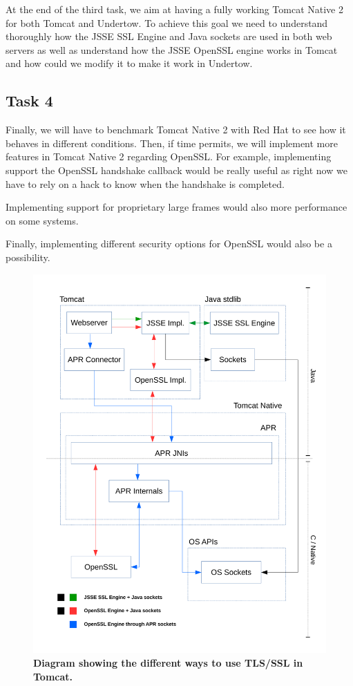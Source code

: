 \documentclass[11pt,a4paper,bibliography=totocnumbered]{scrartcl}
\def\mytitle{Tomcat Native 2}
\begin{document}
At the end of the third task, we aim at having a fully working \mytitle{} for both Tomcat and Undertow. To achieve this goal we need to understand thoroughly how the JSSE SSL Engine and Java sockets are used in both web servers as well as understand how the JSSE OpenSSL engine works in Tomcat and how could we modify it to make it work in Undertow.

\subsection{Task 4}
\label{subsec:task4}

Finally, we will have to benchmark \mytitle{} with Red Hat to see how it behaves in different conditions. Then, if time permits, we will implement more features in \mytitle{} regarding OpenSSL. For example, implementing support the OpenSSL handshake callback would be really useful as right now we have to rely on a hack to know when the handshake is completed.

Implementing support for proprietary large frames would also more performance on some systems.

Finally, implementing different security options for OpenSSL would also be a possibility.
\newpage
\printbibliography

\begin{figure}[!h]
\begin{center}
\includegraphics[scale=0.7]{diagram_current_way.pdf}
\end{center}
\caption{\textbf{Diagram showing the different ways to use TLS/SSL in Tomcat.}}
\label{fig:current}
\end{figure}
\end{document}
